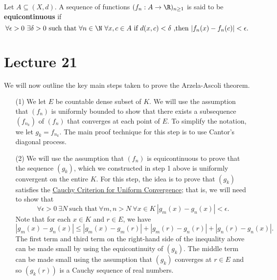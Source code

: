 \begin{definition}
    Let \( A \subseteq (X,d) \). A sequence of functions \( ({f}_{n} : A \to \R)_{n \geq 1} \) is said to be \textbf{equicontinuous} if 
    \[  \forall \epsilon > 0 \ \exists \delta > 0 \ \text{such that} \ \forall n \in \N \ \forall x,c \in A \ \text{if} \ d(x,c) < \delta \ \text{,then} \ | {f}_{n}(x) - {f}_{n}(c) |  < \epsilon. \]
\end{definition}


\section{Lecture 21}

We will now outline the key main steps taken to prove the Arzela-Ascoli theorem. 

\begin{enumerate}
\item[(1)] We let \( E  \) be countable dense subset of \( K   \). We will use the assumption that \( ({f}_{n}) \) is uniformly bounded to show that there exists a subsequence \( ({f}_{{n}_{k }}) \) of \( ({f}_{n}) \) that converges at each point of \( E  \). To simplify the notation, we let \( {g}_{k } = {f}_{{n}_{k }} \). The main proof technique for this step is to use Cantor's diagonal process. 
\item[(2)] We will use the assumption that \( ({f}_{n}) \) is equicontinuous to prove that the sequence \( ({g}_{k}) \), which we constructed in step 1 above is uniformly convergent on the entire \(  K  \). For this step, the idea is to prove that \( ({g}_{k}) \) satisfies the {\hyperref[Cauchy Criterion for Uniform Convergence]{Cauchy Criterion for Uniform Convergence}}; that is, we will need to show that 
    \[  \forall \epsilon > 0 \ \exists N \ \text{such that} \ \forall m,n > N \ \forall x \in K \ | {g}_{m}(x) - {g}_{n}(x) | < \epsilon. \]
    Note that for each \( x \in K  \) and \( r \in E  \), we have 
    \[  | {g}_{m}(x) - {g}_{n}(x) | \leq | {g}_{m}(x) - {g}_{m}(r) | + | {g}_{m}(r) - {g}_{n}(r)  |  + | {g}_{n}(r) - {g}_{n}(x) |. \]
    The first term and third term on the right-hand side of the inequality above can be made small by using the equicontinuity of \( ({g}_{k}) \). The middle term can be made small using the assumption that \( ({g}_{k}) \) converges at \( r \in E  \) and so \( ({g}_{k }(r)) \) is a Cauchy sequence of real numbers.
\end{enumerate}

